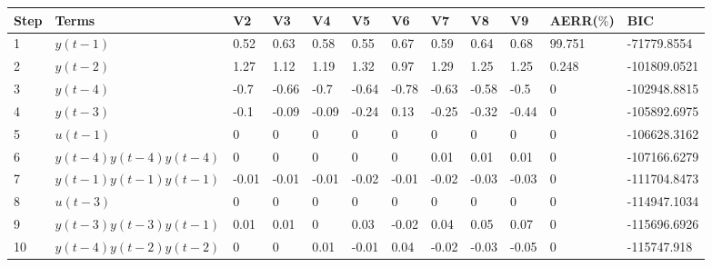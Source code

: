 \begin{tabular}{llllllllllll}
Step & Terms & V2 & V3 & V4 & V5 & V6 & V7 & V8 & V9 & AERR($\%$) & BIC \\ 
\hline 
1 & $y(t-1)$ & 0.52 & 0.63 & 0.58 & 0.55 & 0.67 & 0.59 & 0.64 & 0.68 & 99.751 & -71779.8554 \\ 
2 & $y(t-2)$ & 1.27 & 1.12 & 1.19 & 1.32 & 0.97 & 1.29 & 1.25 & 1.25 & 0.248 & -101809.0521 \\ 
3 & $y(t-4)$ & -0.7 & -0.66 & -0.7 & -0.64 & -0.78 & -0.63 & -0.58 & -0.5 & 0 & -102948.8815 \\ 
4 & $y(t-3)$ & -0.1 & -0.09 & -0.09 & -0.24 & 0.13 & -0.25 & -0.32 & -0.44 & 0 & -105892.6975 \\ 
5 & $u(t-1)$ & 0 & 0 & 0 & 0 & 0 & 0 & 0 & 0 & 0 & -106628.3162 \\ 
6 & $y(t-4)y(t-4)y(t-4)$ & 0 & 0 & 0 & 0 & 0 & 0.01 & 0.01 & 0.01 & 0 & -107166.6279 \\ 
7 & $y(t-1)y(t-1)y(t-1)$ & -0.01 & -0.01 & -0.01 & -0.02 & -0.01 & -0.02 & -0.03 & -0.03 & 0 & -111704.8473 \\ 
8 & $u(t-3)$ & 0 & 0 & 0 & 0 & 0 & 0 & 0 & 0 & 0 & -114947.1034 \\ 
9 & $y(t-3)y(t-3)y(t-1)$ & 0.01 & 0.01 & 0 & 0.03 & -0.02 & 0.04 & 0.05 & 0.07 & 0 & -115696.6926 \\ 
10 & $y(t-4)y(t-2)y(t-2)$ & 0 & 0 & 0.01 & -0.01 & 0.04 & -0.02 & -0.03 & -0.05 & 0 & -115747.918 \\ 
\hline 
\end{tabular}